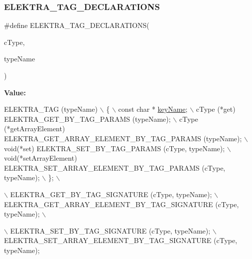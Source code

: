 \subsubsection{\texorpdfstring{E\+L\+E\+K\+T\+R\+A\+\_\+\+T\+A\+G\+\_\+\+D\+E\+C\+L\+A\+R\+A\+T\+I\+O\+NS}{ELEKTRA\_TAG\_DECLARATIONS}}
{\footnotesize\ttfamily \#define E\+L\+E\+K\+T\+R\+A\+\_\+\+T\+A\+G\+\_\+\+D\+E\+C\+L\+A\+R\+A\+T\+I\+O\+NS(\begin{DoxyParamCaption}\item[{}]{c\+Type,  }\item[{}]{type\+Name }\end{DoxyParamCaption})}

{\bfseries Value\+:}
\begin{DoxyCode}
ELEKTRA\_TAG (typeName)                                                                                     
                              \(\backslash\)
        \{                                                                                                  
                                      \(\backslash\)
                const \textcolor{keywordtype}{char} * \hyperlink{group__keyname_ga8e805c726a60da921d3736cda7813513}{keyName};                                                               
                                             \(\backslash\)
                cType (*\textcolor{keyword}{get}) ELEKTRA\_GET\_BY\_TAG\_PARAMS (typeName);                                         
                                      \(\backslash\)
                cType (*getArrayElement) ELEKTRA\_GET\_ARRAY\_ELEMENT\_BY\_TAG\_PARAMS (typeName);               
                                      \(\backslash\)
                \textcolor{keywordtype}{void}(*set) ELEKTRA\_SET\_BY\_TAG\_PARAMS (cType, typeName);                                    
                                      \(\backslash\)
                \textcolor{keywordtype}{void}(*setArrayElement) ELEKTRA\_SET\_ARRAY\_ELEMENT\_BY\_TAG\_PARAMS (cType, typeName);          
                                      \(\backslash\)
        \};                                                                                                 
                                      \(\backslash\)
                                                                                                           
                                      \(\backslash\)
        ELEKTRA\_GET\_BY\_TAG\_SIGNATURE (cType, typeName);                                                    
                                      \(\backslash\)
        ELEKTRA\_GET\_ARRAY\_ELEMENT\_BY\_TAG\_SIGNATURE (cType, typeName);                                      
                                      \(\backslash\)
                                                                                                           
                                      \(\backslash\)
        ELEKTRA\_SET\_BY\_TAG\_SIGNATURE (cType, typeName);                                                    
                                      \(\backslash\)
        ELEKTRA\_SET\_ARRAY\_ELEMENT\_BY\_TAG\_SIGNATURE (cType, typeName);
\end{DoxyCode}


